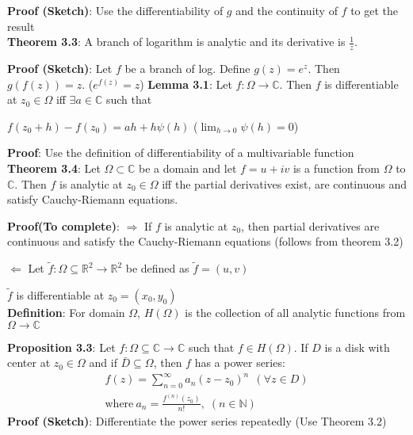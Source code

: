 \documentclass{article}
\begin{document}
\begin{flushleft}
\textbf{Proof (Sketch)}: Use the differentiability of $g$ and the continuity of $f$ to get the result \\
\vspace{3mm}
\textbf{Theorem 3.3}: A branch of logarithm is analytic and its derivative is $\frac{1}{z}$.

\textbf{Proof (Sketch)}: Let $f$ be a branch of log. Define $g(z)=e^z$. Then $g(f(z))=z$. ($e^{f(z)}=z$)
\clearpage
\textbf{Lemma 3.1}: Let $f:\Omega \rightarrow \mathds{C}$. Then $f$ is differentiable at $z_0\in \Omega$ iff $\exists a\in \mathds{C}$ such that 

$f(z_0+h)-f(z_0)= ah+h\psi(h)$ ($\lim_{h \to 0} \psi(h)=0$)

\textbf{Proof}: Use the definition of differentiability of a multivariable function\\
\vspace{3mm}
\textbf{Theorem 3.4}: Let $\Omega \subset \mathds{C}$ be a domain and let $f=u+iv$ is a function from $\Omega$ to $\mathds{C}$.
Then $f$ is analytic at $z_0\in \Omega$ iff the partial derivatives exist, are continuous and satisfy Cauchy-Riemann equations.

\textbf{Proof(To complete)}: $\Rightarrow$ If $f$ is analytic at $z_0$, then partial derivatives are continuous and satisfy the Cauchy-Riemann equations (follows from theorem 3.2)

$\Leftarrow$ Let $\tilde{f}:\Omega \subseteq \mathds{R}^2\rightarrow \mathds{R}^2$ be defined as $\tilde{f}=(u,v)$

$\tilde{f}$ is differentiable at $z_0=(x_0,y_0)$\\
\vspace{3mm}
\textbf{Definition}: For domain $\Omega$, $H(\Omega)$ is the collection of all analytic functions from $\Omega \rightarrow \mathds{C}$

\textbf{Proposition 3.3}: Let $f:\Omega\subseteq \mathds{C} \rightarrow \mathds{C}$ such that $f\in H(\Omega)$. If $D$ is a disk with center at $z_0\in \Omega$ and if $\bar{D}\subseteq \Omega$, then $f$ has a power series:
\begin{align}
f(z)=\sum_{n=0}^{\infty} a_n(z-z_0)^n \:\:(\forall z\in D) \nonumber\\
\text{where}\: a_n=\frac{f^{(n)}(z_0)}{n!}\text{,}\:\: (n\in \mathds{N})\nonumber
\end{align}
\textbf{Proof (Sketch)}: Differentiate the power series repeatedly (Use Theorem 3.2)


\end{flushleft}
\end{document}
